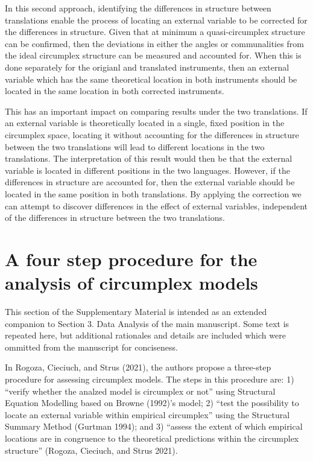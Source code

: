 \documentclass[
  default,
]{sn-jnl}
\begin{document}
In this second approach, identifying the differences in structure
between translations enable the process of locating an external variable
to be corrected for the differences in structure. Given that at minimum
a quasi-circumplex structure can be confirmed, then the deviations in
either the angles or communalities from the ideal circumplex structure
can be measured and accounted for. When this is done separately for the
origianl and translated instruments, then an external variable which has
the same theoretical location in both instruments should be located in
the same location in both corrected instruments.

This has an important impact on comparing results under the two
translations. If an external variable is theoretically located in a
single, fixed position in the circumplex space, locating it without
accounting for the differences in structure between the two translations
will lead to different locations in the two translations. The
interpretation of this result would then be that the external variable
is located in different positions in the two languages. However, if the
differences in structure are accounted for, then the external variable
should be located in the same position in both translations. By applying
the correction we can attempt to discover differences in the effect of
external variables, independent of the differences in structure between
the two translations.

\section{A four step procedure for the analysis of circumplex
models}\label{a-four-step-procedure-for-the-analysis-of-circumplex-models}

This section of the Supplementary Material is intended as an extended
companion to Section 3. Data Analysis of the main manuscript. Some text
is repeated here, but additional rationales and details are included
which were ommitted from the manuscript for conciseness.

In Rogoza, Cieciuch, and Strus (2021), the authors propose a three-step
procedure for assessing circumplex models. The steps in this procedure
are: 1) ``verify whether the analzed model is circumplex or not'' using
Structural Equation Modelling based on Browne (1992)'s model; 2) ``test
the possibility to locate an external variable within empirical
circumplex'' using the Structural Summary Method (Gurtman 1994); and 3)
``assess the extent of which empirical locations are in congruence to
the theoretical predictions within the circumplex structure'' (Rogoza,
Cieciuch, and Strus 2021).
\end{document}
